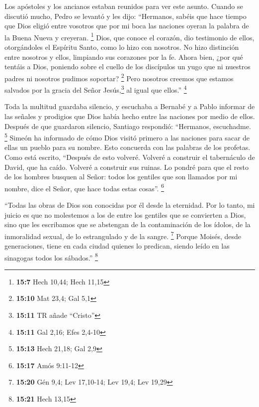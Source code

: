 \begin{paracol}{2}
 Los apóstoles y los ancianos estaban reunidos para ver
este asunto.  Cuando se discutió mucho, Pedro se levantó y
les dijo: ``Hermanos, sabéis que hace tiempo que Dios eligió entre
vosotros que por mi boca las naciones oyeran la palabra de la Buena
Nueva y creyeran. \footnote{\textbf{15:7} Hech 10,44; Hech 11,15}
 Dios, que conoce el corazón, dio testimonio de ellos,
otorgándoles el Espíritu Santo, como lo hizo con nosotros.
 No hizo distinción entre nosotros y ellos, limpiando sus
corazones por la fe.  Ahora bien, ¿por qué tentáis a
Dios, poniendo sobre el cuello de los discípulos un yugo que ni nuestros
padres ni nosotros pudimos soportar? \footnote{\textbf{15:10} Mat 23,4;
  Gal 5,1}  Pero nosotros creemos que estamos salvados
por la gracia del Señor Jesús,\footnote{\textbf{15:11} TR añade
  ``Cristo''} al igual que ellos.'' \footnote{\textbf{15:11} Gal 2,16;
  Efes 2,4-10}

 Toda la multitud guardaba silencio, y escuchaba a
Bernabé y a Pablo informar de las señales y prodigios que Dios había
hecho entre las naciones por medio de ellos.  Después de
que guardaron silencio, Santiago respondió: ``Hermanos, escuchadme.
\footnote{\textbf{15:13} Hech 21,18; Gal 2,9}  Simeón ha
informado de cómo Dios visitó primero a las naciones para sacar de ellas
un pueblo para su nombre.  Esto concuerda con las
palabras de los profetas. Como está escrito,  ``Después
de esto volveré. Volveré a construir el tabernáculo de David, que ha
caído. Volveré a construir sus ruinas. Lo pondré  para
que el resto de los hombres busquen al Señor: todos los gentiles que son
llamados por mi nombre, dice el Señor, que hace todas estas cosas''.
\footnote{\textbf{15:17} Amós 9:11-12}

 ``Todas las obras de Dios son conocidas por él desde la
eternidad.  Por lo tanto, mi juicio es que no molestemos
a los de entre los gentiles que se convierten a Dios, 
sino que les escribamos que se abstengan de la contaminación de los
ídolos, de la inmoralidad sexual, de lo estrangulado y de la sangre.
\footnote{\textbf{15:20} Gén 9,4; Lev 17,10-14; Lev 19,4; Lev 19,29}
 Porque Moisés, desde generaciones, tiene en cada ciudad
quienes lo predican, siendo leído en las sinagogas todos los sábados.''
\footnote{\textbf{15:21} Hech 13,15}

\hypertarget{la-resoluciuxf3n-y-su-implementaciuxf3n}{%
}
\end{paracol}
